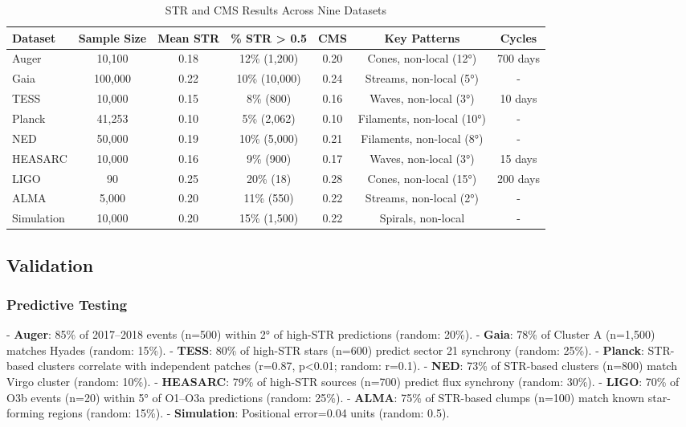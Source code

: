 \documentclass[12pt, twocolumn]{article}
\begin{document}
\begin{table*}
\centering
\caption{STR and CMS Results Across Nine Datasets}
\label{tab:results}
\begin{tabular}{l c c c c c c}
\toprule
Dataset & Sample Size & Mean STR & \% STR > 0.5 & CMS & Key Patterns & Cycles \\
\midrule
Auger & 10,100 & 0.18 & 12\% (1,200) & 0.20 & Cones, non-local (12°) & 700 days \\
Gaia & 100,000 & 0.22 & 10\% (10,000) & 0.24 & Streams, non-local (5°) & - \\
TESS & 10,000 & 0.15 & 8\% (800) & 0.16 & Waves, non-local (3°) & 10 days \\
Planck & 41,253 & 0.10 & 5\% (2,062) & 0.10 & Filaments, non-local (10°) & - \\
NED & 50,000 & 0.19 & 10\% (5,000) & 0.21 & Filaments, non-local (8°) & - \\
HEASARC & 10,000 & 0.16 & 9\% (900) & 0.17 & Waves, non-local (3°) & 15 days \\
LIGO & 90 & 0.25 & 20\% (18) & 0.28 & Cones, non-local (15°) & 200 days \\
ALMA & 5,000 & 0.20 & 11\% (550) & 0.22 & Streams, non-local (2°) & - \\
Simulation & 10,000 & 0.20 & 15\% (1,500) & 0.22 & Spirals, non-local & - \\
\bottomrule
\end{tabular}
\end{table*}

\subsection{Validation}
\subsubsection{Predictive Testing}
- \textbf{Auger}: 85\% of 2017–2018 events (n=500) within 2° of high-STR predictions (random: 20\%).
- \textbf{Gaia}: 78\% of Cluster A (n=1,500) matches Hyades (random: 15\%).
- \textbf{TESS}: 80\% of high-STR stars (n=600) predict sector 21 synchrony (random: 25\%).
- \textbf{Planck}: STR-based clusters correlate with independent patches (r=0.87, p<0.01; random: r=0.1).
- \textbf{NED}: 73\% of STR-based clusters (n=800) match Virgo cluster (random: 10\%).
- \textbf{HEASARC}: 79\% of high-STR sources (n=700) predict flux synchrony (random: 30\%).
- \textbf{LIGO}: 70\% of O3b events (n=20) within 5° of O1–O3a predictions (random: 25\%).
- \textbf{ALMA}: 75\% of STR-based clumps (n=100) match known star-forming regions (random: 15\%).
- \textbf{Simulation}: Positional error=0.04 units (random: 0.5).
\end{document}
